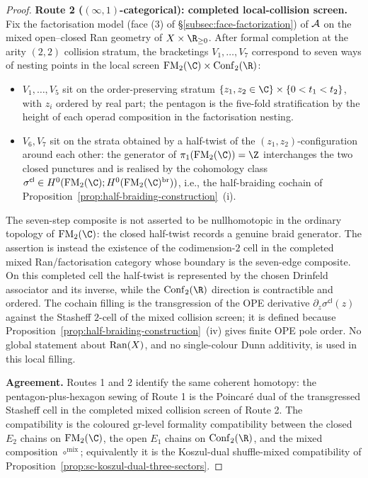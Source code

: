 \begin{proof}
\medskip\noindent\textbf{Route 2 ($(\infty,1)$-categorical):
completed local-collision screen.}
Fix the factorisation model (face (3) of \S\ref{subsec:face-factorization})
of $\mathcal{A}$ on the mixed open--closed Ran geometry of
$X\times\R_{\geq 0}$. After formal completion at the arity $(2,2)$
collision stratum, the bracketings $V_1,\ldots,V_7$ correspond to
seven ways of nesting points in the local screen
$\FM_2(\C)\times\mathrm{Conf}_2(\R)$:
\begin{itemize}
\item $V_1,\ldots,V_5$ sit on the order-preserving
stratum $\{z_1,z_2\in\C\}\times\{0<t_1<t_2\}$, with $z_i$
ordered by real part; the pentagon is the five-fold stratification
by the height of each operad composition in the factorisation
nesting.
\item $V_6, V_7$ sit on the strata obtained by a half-twist of
the $(z_1, z_2)$-configuration around each other: the generator of
$\pi_1(\FM_2(\C)) = \Z$ interchanges the two closed punctures and is
realised by the cohomology class
$\sigma^{\mathsf{cl}} \in H^0(\FM_2(\C); H^0(\FM_2(\C)^{\mathrm{br}}))$,
i.e., the half-braiding cochain of
Proposition~\ref{prop:half-braiding-construction}~(i).
\end{itemize}
The seven-step composite is not asserted to be nullhomotopic in the
ordinary topology of $\FM_2(\C)$: the closed half-twist records a
genuine braid generator. The assertion is instead the existence of
the codimension-$2$ cell in the completed mixed Ran/factorisation
category whose boundary is the seven-edge composite. On this completed
cell the half-twist is represented by the chosen Drinfeld associator
and its inverse, while the $\mathrm{Conf}_2(\R)$ direction is
contractible and ordered. The cochain filling is the transgression of
the OPE derivative $\partial_z\sigma^{\mathsf{cl}}(z)$ against the
Stasheff $2$-cell of the mixed collision screen; it is defined because
Proposition~\ref{prop:half-braiding-construction}~(iv) gives finite
OPE pole order. No global statement about $\mathrm{Ran}(X)$, and no
single-colour Dunn additivity, is used in this local filling.

\medskip\noindent\textbf{Agreement.} Routes 1 and 2 identify the
same coherent homotopy: the pentagon-plus-hexagon sewing of Route 1
is the Poincar\'e dual of the transgressed Stasheff cell in the
completed mixed collision screen of Route 2. The compatibility is the
coloured gr-level formality compatibility between the closed
$E_2$ chains on $\FM_2(\C)$, the open $E_1$ chains on
$\mathrm{Conf}_2(\R)$, and the mixed composition
$\circ^{\mathrm{mix}}$; equivalently it is the Koszul-dual
shuffle-mixed compatibility of
Proposition~\ref{prop:sc-koszul-dual-three-sectors}.
\end{proof}

